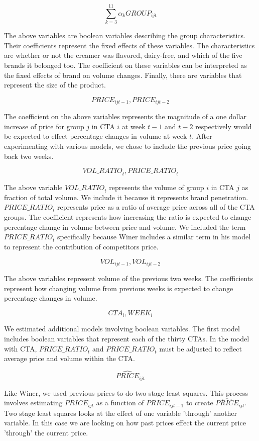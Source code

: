 \documentclass{article}
\begin{document}
$$ \sum_{k=3}^{11} \alpha_k {GROUP}_{ijt} $$ 

The above variables are boolean variables describing the group characteristics. Their coefficients represent the fixed effects of these variables. The characteristics are whether or not the creamer was flavored, dairy-free, and which of the five brands it belonged too.  The coefficient on these variables can be interpreted as the fixed effects of brand on volume changes. Finally, there are variables that represent the size of the product.

$${PRICE}_{ijt-1}, {PRICE}_{ijt-2} $$

The coefficient on the above variables represents the magnitude of a one dollar increase of price for group $j$ in CTA $i$ at week $t-1$ and $t-2$ respectively would be expected to effect percentage changes in volume at week $t$. After experimenting with various models, we chose to include the previous price going back two weeks.

$${VOL\_RATIO}_t, {PRICE\_RATIO}_{t} $$ 

The above variable $ {VOL\_RATIO}_t $ represents the volume of group $i$ in CTA $j$ as fraction of total volume. We include it because it represents brand penetration.  ${PRICE\_RATIO}_{t} $ represents price as a ratio of average price across all of the CTA groups. The coefficient represents how increasing the ratio is expected to change percentage change in volume between price and volume. We included the term ${PRICE\_RATIO}_{t}$  specifically because Winer includes a similar term in his model to represent the contribution of competitors price.

$${VOL}_{ijt-1}, {VOL}_{ijt-2} $$

The above variables represent volume of the previous two weeks. The coefficients represent how changing volume from previous weeks is expected to change percentage changes in volume.

$$ CTA_i, WEEK_{i}$$

We estimated additional models involving boolean variables. The first model includes boolean variables that represent each of the thirty CTAs. In the model with CTA, ${PRICE\_RATIO}_{t}$ and ${PRICE\_RATIO}_{t}$ must be adjusted to reflect average price and volume within the CTA.

$$\widehat{PRICE}_{ijt}$$

Like Winer, we used previous prices to do two stage least squares. This process involves estimating ${PRICE}_{ijt}$ as a function of ${PRICE}_{ijt-1}$ to create $\widehat{PRICE}_{ijt}$. Two stage least squares looks at the effect of one variable 'through' another variable.  In this case we are looking on how past prices effect the current price 'through' the current price. 
\end{document}
